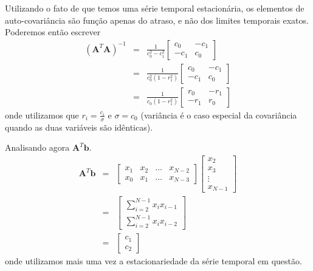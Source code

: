 \begin{frame}[allowframebreaks]
  Utilizando o fato de que temos uma série temporal estacionária,
  os elementos de auto-covariância são função apenas do atraso, e
  não dos limites temporais exatos. Poderemos então escrever
  \begin{eqnarray}
  (\mathbf{A}^T \mathbf{A})^{-1} &=& \frac{1}{c_0^2 - c_1^2} \begin{bmatrix} c_0 & -c_1 \\ -c_1 & c_0 \end{bmatrix} \nonumber \\
  &=& \frac{1}{c_0^2 ( 1 - r_1^2)} \begin{bmatrix} c_0 & -c_1 \\ -c_1 & c_0 \end{bmatrix} \nonumber \\
  &=& \frac{1}{c_0 ( 1 - r_1^2)} \begin{bmatrix} r_0 & -r_1 \\ -r_1 & r_0 \end{bmatrix} \nonumber
  \end{eqnarray}
  onde utilizamos que $r_i = \frac{c_i}{\sigma}$ e $\sigma = c_0$ 
  (variância é o caso especial da covariância quando as duas variáveis
  são idênticas).
  
  Analisando agora $\mathbf{A}^T\mathbf{b}$.
  \begin{eqnarray}
  \mathbf{A}^T\mathbf{b} &=& \begin{bmatrix} x_1 & x_2 & \ldots & x_{N-2} \\ x_0 & x_1 & \ldots & x_{N-3} \end{bmatrix} \begin{bmatrix}x_2 \\ x_3 \\ \vdots \\ x_{N-1}\end{bmatrix} \nonumber \\
  &=& \begin{bmatrix} \sum_{i=2}^{N-1} x_i x_{i-1} \\ \sum_{i=2}^{N-1} x_i x_{i-2}\end{bmatrix} \nonumber \\
  &=& \begin{bmatrix} c_1 \\ c_2 \end{bmatrix}
  \end{eqnarray}
  onde utilizamos mais uma vez a estacionariedade da série temporal 
  em questão.
   

\end{frame}
